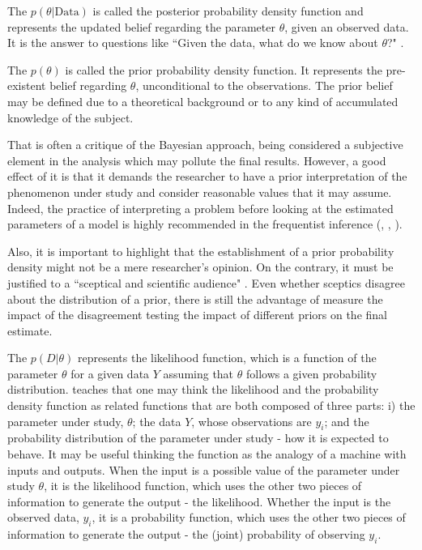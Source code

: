The $p(\theta|\text{Data})$ is called the posterior probability density function and represents the updated belief regarding the parameter $\theta$, given an observed data. It is the answer to questions like ``Given the data, what do we know about $\theta$?" \citep{koop2003}.

The $p(\theta)$ is called the prior probability density function. It represents the pre-existent belief regarding $\theta$, unconditional to the observations. The prior belief may be defined due to a theoretical background or to any kind of accumulated knowledge of the subject. 

That is often a critique of the Bayesian approach, being considered a subjective element in the analysis which may pollute the final results. However, a good effect of it is that it demands the researcher to have a prior interpretation of the phenomenon under study and consider reasonable values that it may assume. Indeed, the practice of interpreting a problem before looking at the estimated parameters of a model is highly recommended in the frequentist inference (\cite{gujarati2009}, \cite{kennedy2003}, \cite{studenmund2011}). 

Also, it is important to highlight that the establishment of a prior probability density might not be a mere researcher's opinion. On the contrary, it must be justified to a ``sceptical and scientific audience" \citep{kruschke2012}. Even whether sceptics disagree about the distribution of a prior, there is still the advantage of measure the impact of the disagreement testing the impact of different priors on the final estimate.

The $p(D|\theta)$ represents the likelihood function, which is a function of the parameter $\theta$ for a given data $Y$ assuming that $\theta$ follows a given probability distribution. \cite{gujarati2009} teaches that one may think the likelihood and the probability density function as related functions that are both composed of three parts: i) the parameter under study, $\theta$; the data $Y$, whose observations are $y_i$; and the probability distribution of the parameter under study - how it is expected to behave. It may be useful thinking the function as the analogy of a machine with inputs and outputs. When the input is a possible value of the parameter under study $\theta$, it is the likelihood function, which uses the other two pieces of information to generate the output - the likelihood. Whether the input is the observed data, $y_i$, it is a probability function, which uses the other two pieces of information to generate the output - the (joint) probability of observing $y_i$. 

